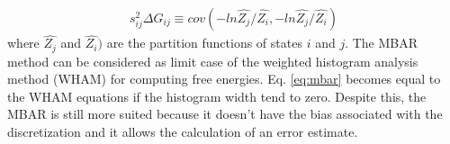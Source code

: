 \begin{equation}
\label{eq:varmbar}
\begin{aligned}
s_{ij}^{2} \Delta G_{ij} \equiv cov (-ln \hat{Z_{j}}/\hat{Z_{i}},-ln \hat{Z_{j}}/\hat{Z_{i}})
\end{aligned}
\end{equation}
where $\hat{Z_{j}}$ and $\hat{Z_{i}})$ are the partition functions of states $i$ and $j$. The MBAR method can be considered as limit case of the 
weighted histogram analysis method (WHAM) \cite{wham} for computing free energies. Eq. \eqref{eq:mbar} becomes equal to the WHAM equations if the histogram width tend to zero. Despite this, the MBAR is still more suited because it doesn't have the bias associated with the discretization  and it allows the calculation of an error estimate.



